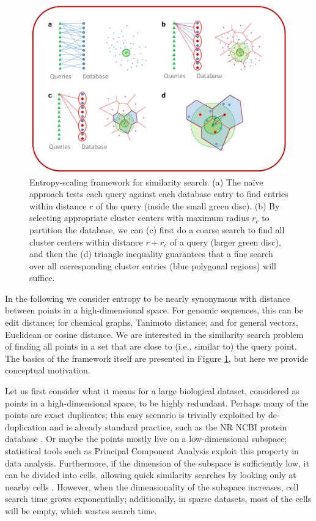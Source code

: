\documentclass[review,preprint,12pt]{elsarticle}
\renewcommand{\cite}{\citep} %
\theoremstyle{definition}
\theoremstyle{remark}
\numberwithin{equation}{section}
\begin{document}
\begin{figure}[p]
    \centering
    \centerline{\includegraphics[width=8in]{assets/dataStructure.png}}
    \caption{ Entropy-scaling framework for similarity search. %
            (a) The na\"ive approach tests each query against each database entry to find entries within distance $r$ of the query (inside the small green disc). %
            (b) By selecting appropriate cluster centers with maximum radius $r_c$ to partition the database, we can (c) first do a coarse search to find all cluster centers within distance $r+r_c$ of a query (larger green disc), %
 and then the (d) triangle inequality guarantees that a fine search over all corresponding cluster entries (blue polygonal regions) will suffice.}
    \label{fig:dataStructure}
\end{figure}

In the following we consider entropy to be nearly synonymous with distance between points in a high-dimensional space.
For genomic sequences, this can be edit distance; for chemical graphs, Tanimoto 
distance; and for general vectors, Euclidean or cosine distance.
We are interested in the similarity search problem of
finding all points in a set that are close to (i.e., similar to) the query point.
The basics of the framework itself are presented in Figure \ref{fig:dataStructure}, but here we provide conceptual motivation.

Let us first consider what it means for a large biological dataset, considered as points in a high-dimensional space, to be highly redundant.
Perhaps many of the points are exact duplicates; this easy scenario is trivially exploited by de-duplication and is already standard practice, such as
the NR NCBI protein database \cite{pruitt2005ncbi}.
Or maybe the points mostly live on a low-dimensional subspace; statistical tools such as Principal Component Analysis exploit this property in data analysis.
Furthermore, if the dimension of the subspace is sufficiently low,
it can be divided into cells, allowing quick similarity searches by looking only at nearby cells \cite{weber1998quantitative}.
However, when the dimensionality of the subspace increases, cell search time 
grows exponentially; additionally, in sparse datasets, most of the cells will 
be empty, which wastes search time.
\end{document}
